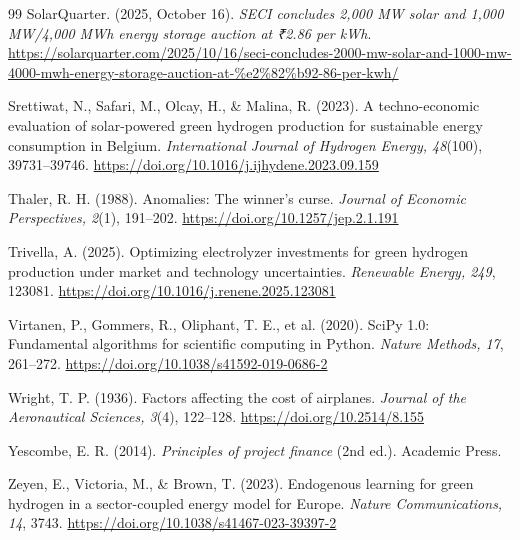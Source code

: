 {\begin{thebibliography}{99}
 SolarQuarter. (2025, October 16). \emph{SECI concludes 2,000 MW solar and 1,000 MW/4,000 MWh energy storage auction at ₹2.86 per kWh}. \url{https://solarquarter.com/2025/10/16/seci-concludes-2000-mw-solar-and-1000-mw-4000-mwh-energy-storage-auction-at-%e2%82%b92-86-per-kwh/}

 Srettiwat, N., Safari, M., Olcay, H., \& Malina, R. (2023). A techno-economic evaluation of solar-powered green hydrogen production for sustainable energy consumption in Belgium. \emph{International Journal of Hydrogen Energy, 48}(100), 39731--39746. \url{https://doi.org/10.1016/j.ijhydene.2023.09.159}

 Thaler, R. H. (1988). Anomalies: The winner's curse. \emph{Journal of Economic Perspectives, 2}(1), 191--202. \url{https://doi.org/10.1257/jep.2.1.191}

 Trivella, A. (2025). Optimizing electrolyzer investments for green hydrogen production under market and technology uncertainties. \emph{Renewable Energy, 249}, 123081. \url{https://doi.org/10.1016/j.renene.2025.123081}

 Virtanen, P., Gommers, R., Oliphant, T. E., et al. (2020). SciPy 1.0: Fundamental algorithms for scientific computing in Python. \emph{Nature Methods, 17}, 261--272. \url{https://doi.org/10.1038/s41592-019-0686-2}

 Wright, T. P. (1936). Factors affecting the cost of airplanes. \emph{Journal of the Aeronautical Sciences, 3}(4), 122--128. \url{https://doi.org/10.2514/8.155}

 Yescombe, E. R. (2014). \emph{Principles of project finance} (2nd ed.). Academic Press.

 Zeyen, E., Victoria, M., \& Brown, T. (2023). Endogenous learning for green hydrogen in a sector-coupled energy model for Europe. \emph{Nature Communications, 14}, 3743. \url{https://doi.org/10.1038/s41467-023-39397-2}

\end{thebibliography}
}
